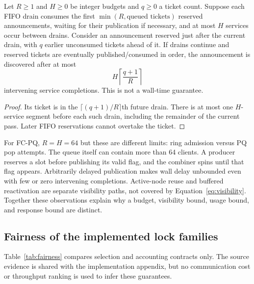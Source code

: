 \begin{proposition}
\label{prop:visibility}
Let $R\ge1$ and $H\ge0$ be integer budgets and $q\ge0$ a ticket count.
Suppose each FIFO drain consumes the first $\min(R,\text{queued tickets})$
reserved announcements, waiting for their publication if necessary, and at
most $H$ services occur between drains. Consider an announcement reserved
just after the current drain, with $q$ earlier unconsumed tickets ahead of it.
If drains continue and reserved tickets are eventually published/consumed
in order, the announcement is discovered after at most
\begin{equation}
 H\left\lceil\frac{q+1}{R}\right\rceil
 \label{eq:visibility}
\end{equation}
intervening service completions. This is not a wall-time guarantee.
\end{proposition}
\begin{proof}
Its ticket is in the $\lceil(q+1)/R\rceil$th future drain. There is at most
one $H$-service segment before each such drain, including the remainder of
the current pass. Later FIFO reservations cannot overtake the ticket.
\end{proof}
For FC-PQ, $R=H=64$ but these are different limits: ring admission versus PQ
pop attempts. The queue itself can contain more than 64 clients. A producer
reserves a slot before publishing its valid flag, and the combiner spins
until that flag appears. Arbitrarily delayed publication makes wall delay
unbounded even with few or zero intervening completions. Active-node reuse
and buffered reactivation are separate visibility paths, not covered by
Equation~\eqref{eq:visibility}. Together these observations explain why a
budget, visibility bound, usage bound, and response bound are distinct.

\subsection{Fairness of the implemented lock families}
\label{sec:fairness-instances}
Table~\ref{tab:fairness} compares selection and accounting contracts only.
The source evidence is shared with the implementation appendix, but no
communication cost or throughput ranking is used to infer these guarantees.

